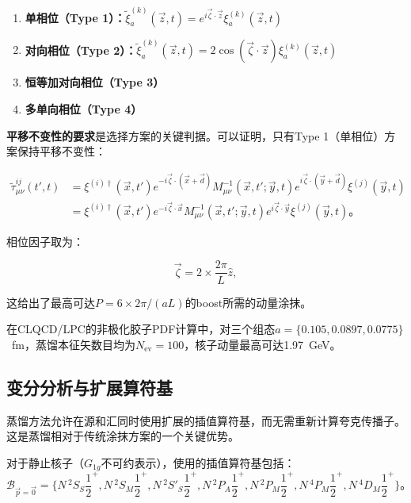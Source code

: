 \documentclass[12pt,a4paper]{ctexart}
\theoremstyle{definition}
\begin{document}
\begin{enumerate}
    \item \textbf{单相位（Type 1）：}$\tilde{\xi}^{(k)}_a(\vec{z}, t) = e^{i\vec{\zeta}\cdot\vec{z}} \xi^{(k)}_a(\vec{z}, t)$
    \item \textbf{对向相位（Type 2）：}$\tilde{\xi}^{(k)}_a(\vec{z}, t) = 2\cos(\vec{\zeta}\cdot\vec{z}) \xi^{(k)}_a(\vec{z}, t)$
    \item \textbf{恒等加对向相位（Type 3）}
    \item \textbf{多单向相位（Type 4）}
\end{enumerate}

\textbf{平移不变性的要求}是选择方案的关键判据\cite{Egerer2021a}。可以证明，只有Type 1（单相位）方案保持平移不变性：

\begin{equation}
\begin{aligned}
\tilde{\tau}^{ij}_{\mu\nu}(t', t) &= \xi^{(i)\dagger}(\vec{x}, t') e^{-i\vec{\zeta}\cdot(\vec{x}+\vec{d})} M^{-1}_{\mu\nu}(\vec{x}, t'; \vec{y}, t) e^{i\vec{\zeta}\cdot(\vec{y}+\vec{d})} \xi^{(j)}(\vec{y}, t) \\
&= \xi^{(i)\dagger}(\vec{x}, t') e^{-i\vec{\zeta}\cdot\vec{x}} M^{-1}_{\mu\nu}(\vec{x}, t'; \vec{y}, t) e^{i\vec{\zeta}\cdot\vec{y}} \xi^{(j)}(\vec{y}, t) 。
\end{aligned}
\label{eq:translation_invariance}
\end{equation}

相位因子取为\cite{Egerer2021a,NoteGluonPDFs}：

\begin{equation}
\vec{\zeta} = 2 \times \frac{2\pi}{L} \hat{z},
\label{eq:phase_factor}
\end{equation}

这给出了最高可达$P = 6 \times 2\pi/(aL)$的boost所需的动量涂抹\cite{NoteGluonPDFs}。

在CLQCD/LPC的非极化胶子PDF计算中\cite{Chen2025gluon}，对三个组态$a = \{0.105, 0.0897, 0.0775\}$~fm，蒸馏本征矢数目均为$N_{\text{ev}} = 100$，核子动量最高可达1.97~GeV。

\subsection{变分分析与扩展算符基}

蒸馏方法允许在源和汇同时使用扩展的插值算符基，而无需重新计算夸克传播子。这是蒸馏相对于传统涂抹方案的一个关键优势\cite{Egerer2021a}。

对于静止核子（$G_{1g}$不可约表示），使用的插值算符基包括\cite{Egerer2021a}：
\begin{equation}
\mathcal{B}_{\vec{p}=\vec{0}} = \{N\,^2S_S\frac{1}{2}^+, N\,^2S_M\frac{1}{2}^+, N\,^2S'_S\frac{1}{2}^+, N\,^2P_A\frac{1}{2}^+, N\,^2P_M\frac{1}{2}^+, N\,^4P_M\frac{1}{2}^+, N\,^4D_M\frac{1}{2}^+\}。
\label{eq:basis_rest}
\end{equation}
\end{document}
